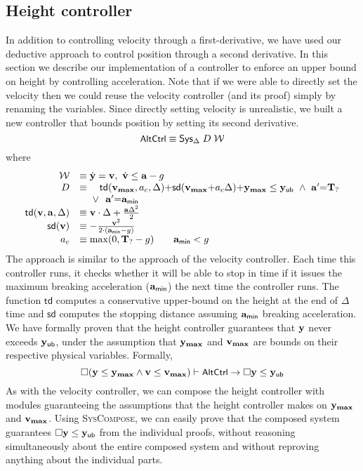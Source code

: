 \subsection{Height controller}
\label{sec:height-shim}

In addition to controlling velocity through a first-derivative, we have
used our deductive approach to control position through a second
derivative.  In this section we describe our implementation of a controller
to enforce an upper bound on height by controlling acceleration.  Note that
if we were able to directly set the velocity then we could reuse the
velocity controller (and its proof) simply by renaming the variables.
Since directly setting velocity is unrealistic, we built a new controller
that bounds position by setting its second derivative.
\[
{\small \textsf{AltCtrl}} \equiv {\textsf{Sys}}{}_{\Delta}\;D\;\mathcal{W}
\]
where
\[
\begin{array}{rl}
\mathcal{W} &\equiv \dot{\mathbf{y}} = \mathbf{v},~\dot{\mathbf{v}}\leq\mathbf{a} - g \\
D &\equiv \quad \mathsf{td}(\mathbf{v_{max}},a_c,\Delta) {+} \mathsf{sd}(\mathbf{v_{max}} {+} a_c\Delta){+}  \mathbf{\mathbf{y}_{max}} \leq \mathsf{\mathbf{y}_{ub}}~\wedge~\mathbf{a}{}^\prime {=} \mathbf{T_{?}} \\
   & ~~~~\vee~~\mathbf{a}{}^\prime {=} \mathbf{a}_{\mathsf{min}} \\
\mathsf{td}(\mathbf{v},\mathbf{a},\Delta) &\equiv \mathbf{v}\cdot\Delta+\frac{\mathbf{a}\Delta^2}{2} \\
\mathsf{sd}(\mathbf{v}) &\equiv -\frac{\mathbf{v}^2}{2\cdot(\mathbf{a}_{\mathsf{min}} - g)} \\
a_{c}  &\equiv \max(0,\mathbf{T_{?}} - g ) \qquad \mathbf{a}_{\mathsf{min}}  < g
\end{array}
\]
The approach is similar to the approach of the velocity controller.  Each
time this controller runs, it checks whether it will be able to stop in
time if it issues the maximum breaking acceleration ($\mathbf{a}_{\mathsf{min}}$) the next time
the controller runs.  The function $\mathsf{td}$ computes a conservative
upper-bound on the height at the end of $\Delta$ time and $\mathsf{sd}$
computes the stopping distance assuming $\mathbf{a}_{\mathsf{min}}$ breaking acceleration.  We
have formally proven that the height controller guarantees that $\mathbf{y}$ never
exceeds $\mathsf{\mathbf{y}_{ub}}$, under the assumption that $\mathbf{\mathbf{y}_{max}}$ and $\mathbf{v_{max}}$ are bounds on
their respective physical variables.  Formally,
\[
\Box{} (\mathbf{y} \leq \mathbf{\mathbf{y}_{max}} \wedge \mathbf{v} \leq \mathbf{v_{max}}) \vdash {\small \textsf{AltCtrl}} \rightarrow \Box{} \mathbf{y} \leq \mathsf{\mathbf{y}_{ub}}
\]
As with the velocity controller, we can compose the height controller with
modules guaranteeing the assumptions that the height controller makes on
$\mathbf{\mathbf{y}_{max}}$ and $\mathbf{v_{max}}$.  Using \textsc{SysCompose}, we can easily prove that
the composed system guarantees $\Box{} \mathbf{y} \leq \mathsf{\mathbf{y}_{ub}}$ from the individual
proofs, without reasoning simultaneously about the entire composed system
and without reproving anything about the individual parts.

